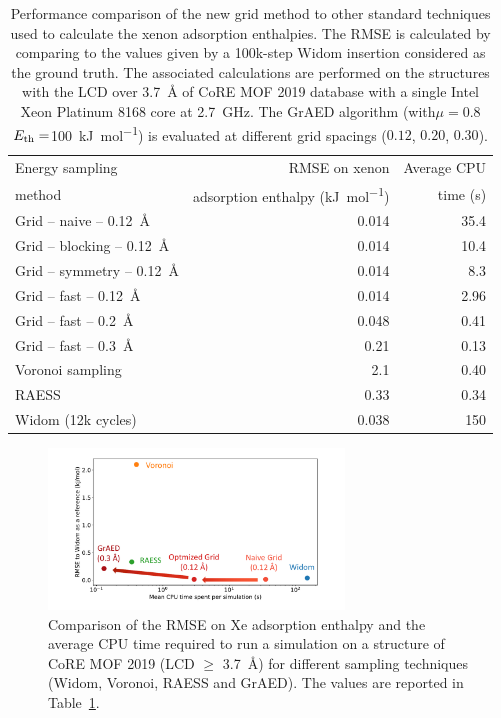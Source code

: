 \documentclass[main]{subfiles}
\begin{document}
\begin{table}[ht]
  \centering
  \setlength{\extrarowheight}{1pt}
  \begin{tabular}{|l|r|r|}
    \hline
    Energy sampling  & RMSE on xenon  &  Average CPU  \\
    method  & adsorption enthalpy (\si{\kilo\joule\per\mole}) &  time (s) \\[0.5mm]
    \hline
    Grid -- naive -- \SI{0.12}{\angstrom} & 0.014  &  35.4 \\[0.5mm] 
    Grid -- blocking -- \SI{0.12}{\angstrom} & 0.014  &  10.4 \\ 
    Grid -- symmetry -- \SI{0.12}{\angstrom} & 0.014  &  8.3 \\ 
    Grid -- fast -- \SI{0.12}{\angstrom} & 0.014  &  2.96 \\
    Grid -- fast -- \SI{0.2}{\angstrom} & 0.048  &  0.41 \\
    Grid -- fast -- \SI{0.3}{\angstrom} & 0.21  &  0.13 \\
    Voronoi sampling &   2.1  & 0.40 \\
    RAESS\autocite{Ren_2023} & 0.33   &  0.34 \\
    Widom\autocite{Widom1963} (12k cycles) & 0.038  &  150 \\
    \hline
  \end{tabular}
  \caption{Performance comparison of the new grid method to other standard techniques used to calculate the xenon adsorption enthalpies. The RMSE is calculated by comparing to the values given by a 100k-step Widom insertion considered as the ground truth. The associated calculations are performed on the structures with the LCD over \SI{3.7}{\angstrom} of CoRE MOF 2019 database with a single Intel Xeon Platinum 8168 core at 2.7~GHz. The GrAED algorithm (with$\mu=0.8$ $E_{\text{th}}=$\SI{100}{\kilo\joule\per\mole}) is evaluated at different grid spacings ($0.12$, $0.20$, $0.30$).}\label{tab:grid}
\end{table}


\begin{figure}[ht]
  \centering
    \includegraphics[width=0.7\textwidth]{figures/3-fastsim/Grid_sumup.pdf}
    \caption{Comparison of the RMSE on Xe adsorption enthalpy and the average CPU time required to run a simulation on a structure of CoRE MOF 2019 (LCD $\geq$ \SI{3.7}{\angstrom}) for different sampling techniques (Widom, Voronoi, RAESS and GrAED). The values are reported in Table~\ref{tab:grid}. }\label{fgr:grid_perfomance}
\end{figure}
\end{document}
